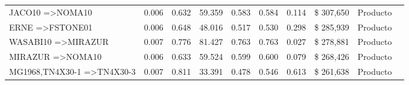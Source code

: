 \documentclass[]{article}
\begin{document}
\begin{landscape}
\begin{table}[htbp]
\begin{tabular}{llllllllll}
				{JACO10} =\textgreater {NOMA10} & 0.006 & 0.632 & 59.359 & 0.583 & 0.584 & 0.114 &  \$       307,650  & Producto \\
				{ERNE} =\textgreater {FSTONE01} & 0.006 & 0.648 & 48.016 & 0.517 & 0.530 & 0.298 &  \$       285,939  & Producto \\
				{WASABI10} =\textgreater {MIRAZUR} & 0.007 & 0.776 & 81.427 & 0.763 & 0.763 & 0.027 &  \$       278,881  & Producto \\
				{MIRAZUR} =\textgreater {NOMA10} & 0.006 & 0.633 & 59.524 & 0.599 & 0.600 & 0.079 &  \$       268,426  & Producto \\
				{MG1968,TN4X30-1} =\textgreater {TN4X30-3} & 0.007 & 0.811 & 33.391 & 0.478 & 0.546 & 0.613 &  \$       261,638  & Producto \\
			\end{tabular}%
			\label{Tab_Reg_Monto}%
		\end{table}%
	\end{landscape}
	\restoregeometry
	
\end{document}
